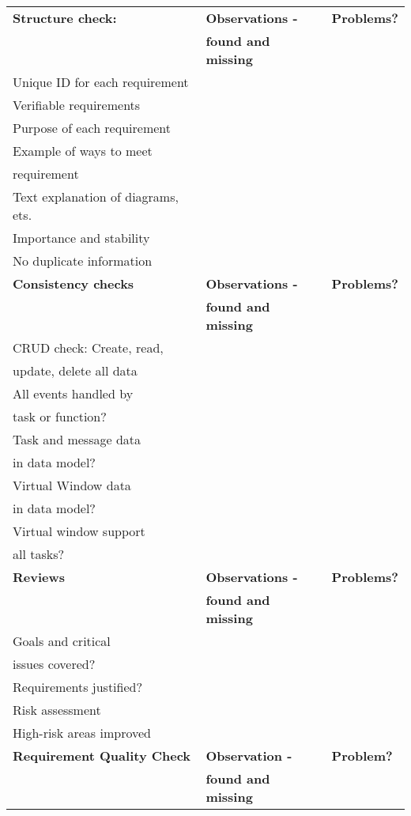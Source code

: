 \documentclass[a4paper]{article}
\begin{document}
	\begin{tabular}{|l|l|l|} \hline
		\textbf{Structure check:} & \textbf{Observations -} & \textbf{Problems?}	\\
			& \textbf{found and missing}	&	\\ \hline
		Unique ID for each requirement	&	&	\\ \hline
		Verifiable requirements	&	&	\\ \hline
		Purpose of each requirement	&	&	\\ \hline
		Example of ways to meet	&	&	\\
		requirement	&	&	\\ \hline
		Text explanation of diagrams, ets.	&	&	\\ \hline
		Importance and stability	&	&	\\ \hline
		No duplicate information	&	&	\\ \hline
		\textbf{Consistency checks}	& \textbf{Observations -} & \textbf{Problems?} \\
			& \textbf{found and missing}	&	\\ \hline
		CRUD check: Create, read, &	&	\\
		update, delete all data	&	&	\\ \hline
		All events handled by	&	&	\\ 
		task or function?	&	&	\\ \hline
		Task and message data	&	&	\\
		in data model?	&	&	\\ \hline
		Virtual Window data	&	&	\\
		in data model?	&	&	\\ \hline
		Virtual window support	&	&	\\
		all tasks?	&	&	\\ \hline
		\textbf{Reviews}     & \textbf{Observations -} & \textbf{Problems?} \\
                        & \textbf{found and missing}    &       \\ \hline
		Goals and critical	&	&	\\
		issues covered?	&	&	\\ \hline
		Requirements justified?	&	&	\\ \hline
		Risk assessment	&	&	\\ \hline
		High-risk areas improved	&	&	\\ \hline
		\textbf{Requirement Quality Check} & \textbf{Observation -} & \textbf{Problem?} \\
		                        & \textbf{found and missing}    &       \\ \hline	

\end{tabular}
\end{document}

